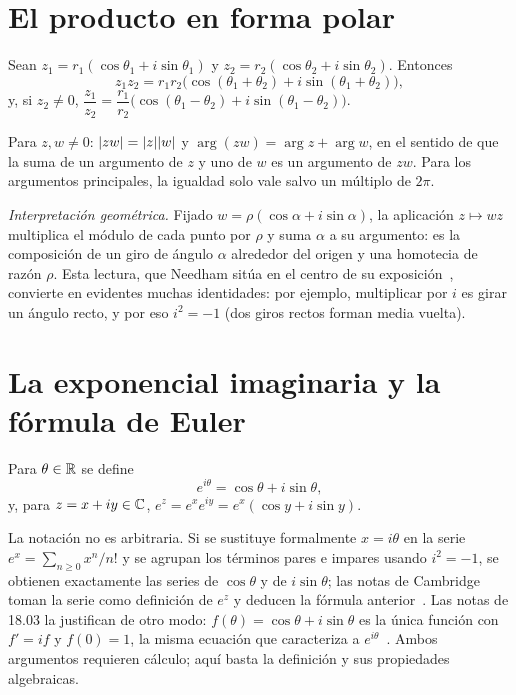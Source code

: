 \section{El producto en forma polar}

\begin{teorema}\label{teo:producto-polar}
Sean $z_1=r_1(\cos\theta_1+i\sin\theta_1)$ y $z_2=r_2(\cos\theta_2+i\sin\theta_2)$. Entonces
\[
z_1z_2=r_1r_2\bigl(\cos(\theta_1+\theta_2)+i\sin(\theta_1+\theta_2)\bigr),
\]
y, si $z_2\ne0$, $\dfrac{z_1}{z_2}=\dfrac{r_1}{r_2}\bigl(\cos(\theta_1-\theta_2)+i\sin(\theta_1-\theta_2)\bigr)$.
\end{teorema}

\begin{corolario}\label{cor:arg-producto}
Para $z,w\ne0$: $\lvert zw\rvert=\lvert z\rvert\lvert w\rvert$ y $\arg(zw)=\arg z+\arg w$, en el sentido de que la suma de un argumento de $z$ y uno de $w$ es un argumento de $zw$. Para los argumentos principales, la igualdad solo vale salvo un múltiplo de $2\pi$.
\end{corolario}

\emph{Interpretación geométrica.} Fijado $w=\rho(\cos\alpha+i\sin\alpha)$, la aplicación $z\mapsto wz$ multiplica el módulo de cada punto por $\rho$ y suma $\alpha$ a su argumento: es la composición de un giro de ángulo $\alpha$ alrededor del origen y una homotecia de razón $\rho$. Esta lectura, que Needham sitúa en el centro de su exposición~\cite[cap.~1]{needham}, convierte en evidentes muchas identidades: por ejemplo, multiplicar por $i$ es girar un ángulo recto, y por eso $i^{2}=-1$ (dos giros rectos forman media vuelta).

\section{La exponencial imaginaria y la fórmula de Euler}

\begin{definicion}\label{def:euler}
Para $\theta\in\mathbb{R}$ se define
\[
e^{i\theta}=\cos\theta+i\sin\theta,
\]
y, para $z=x+iy\in\mathbb{C}$, $e^{z}=e^{x}e^{iy}=e^{x}(\cos y+i\sin y)$.
\end{definicion}

La notación no es arbitraria. Si se sustituye formalmente $x=i\theta$ en la serie $e^{x}=\sum_{n\ge0}x^{n}/n!$ y se agrupan los términos pares e impares usando $i^{2}=-1$, se obtienen exactamente las series de $\cos\theta$ y de $i\sin\theta$; las notas de Cambridge toman la serie como definición de $e^{z}$ y deducen la fórmula anterior~\cite[§1.2]{cambvm}. Las notas de 18.03 la justifican de otro modo: $f(\theta)=\cos\theta+i\sin\theta$ es la única función con $f'=if$ y $f(0)=1$, la misma ecuación que caracteriza a $e^{i\theta}$~\cite[§6.2]{mit1803}. Ambos argumentos requieren cálculo; aquí basta la definición y sus propiedades algebraicas.

